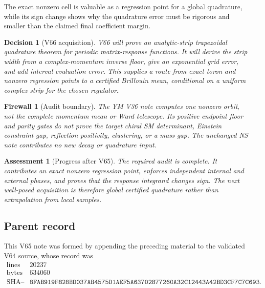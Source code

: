 \documentclass[11pt]{article}
\newtheorem{assessment}[theorem]{Assessment}
\newtheorem{firewall}[theorem]{Firewall}
\newtheorem{decision}[theorem]{Decision}
\begin{document}
The exact nonzero cell is valuable as a regression point for a global
quadrature, while its sign change shows why the quadrature error must
be rigorous and smaller than the claimed final coefficient margin.

\begin{decision}[V66 acquisition]
\label{dec:v11v65-next}
V66 will prove an analytic-strip trapezoidal quadrature theorem for
periodic matrix-response functions.  It will derive the strip width
from a complex-momentum inverse floor, give an exponential grid error,
and add interval evaluation error.  This supplies a route from exact
toron and nonzero regression points to a certified Brillouin mean,
conditional on a uniform complex strip for the chosen regulator.
\end{decision}

\begin{firewall}[Audit boundary]
\label{fire:v11v65-boundary}
The YM V36 note computes one nonzero orbit, not the complete momentum
mean or Ward telescope.  Its positive endpoint floor and parity gates
do not prove the target chiral SM determinant, Einstein constraint
gap, reflection positivity, clustering, or a mass gap.  The unchanged
NS note contributes no new decay or quadrature input.
\end{firewall}

\begin{assessment}[Progress after V65]
\label{ass:v11v65-status}
The required audit is complete.  It contributes an exact nonzero
regression point, enforces independent internal and external phases,
and proves that the response integrand changes sign.  The next
well-posed acquisition is therefore global certified quadrature rather
than extrapolation from local samples.
\end{assessment}

\subsection{Parent record}

This V65 note was formed by appending the preceding material to the
validated V64 source, whose record was
\[
\begin{array}{c|c}
\text{lines}&20237\\
\text{bytes}&634060\\
\text{SHA--256}&
\texttt{8FAB919F828BD037AB4575D1AEF5A63702877260A32C12443A42BD3CF7C7C693}.
\end{array}                                                     \tag{65.7}
\]
\end{document}
